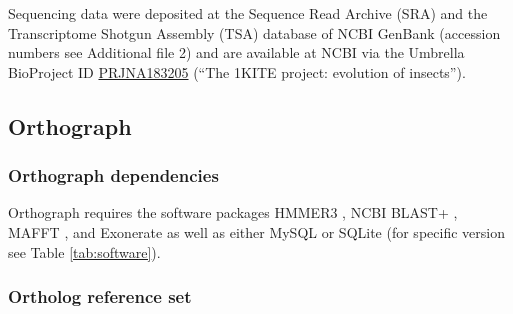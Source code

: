 Sequencing data were deposited at the Sequence Read Archive (SRA) and
the Transcriptome Shotgun Assembly (TSA) database of NCBI GenBank
(accession numbers see Additional file 2) and are available at NCBI via
the Umbrella BioProject ID
\href{http://www.ncbi.nlm.nih.gov/bioproject/?term=PRJNA183205}{PRJNA183205}
(``The 1KITE project: evolution of insects'').

\subsection{Orthograph}

\subsubsection{Orthograph dependencies}

Orthograph requires the software packages HMMER3 \citep{Eddy2011}, NCBI
BLAST+ \citep{Camacho2009}, MAFFT \citep{Katoh2013}, and Exonerate
\citep{Slater2005} as well as either MySQL or SQLite (for specific
version see Table \ref{tab:software}).

\subsubsection{Ortholog reference set}

